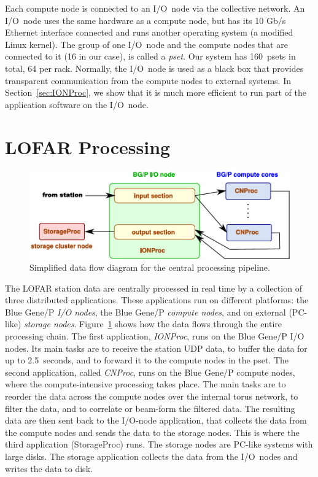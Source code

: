 \documentclass{sig-alternate}
\begin{document}
Each compute node is connected to an I/O~node via the collective network.
An I/O~node uses the same hardware as a compute node, but has its 10 Gb/s Ethernet
interface connected and runs another operating system (a modified Linux kernel).
The group of one I/O~node and the compute nodes that are connected to it (16 in our case),
is called a \emph{pset}.
Our system has 160~psets in total, 64 per rack.
Normally, the I/O~node is used as a black box that provides transparent
communication from the compute nodes to external systems.
In Section~\ref{sec:IONProc}, we show that it is much more
efficient to run part of the application software on the I/O~node.


\section{LOFAR Processing}
\label{sec:processing}

\begin{figure}[ht]
\includegraphics[width=\columnwidth]{processing-overview.pdf}
\caption{Simplified data flow diagram for the central processing pipeline.}
\label{fig:processing}
\end{figure}

The LOFAR station data are centrally processed in real time by a collection
of three distributed applications.
These applications run on different platforms:
the Blue Gene/P \emph{I/O nodes}, the Blue Gene/P \emph{compute nodes}, and on
external (PC-like) \emph{storage nodes}.
Figure~\ref{fig:processing} shows how the data flows through the entire
processing chain.
The first application, \emph{IONProc}, runs on the Blue Gene/P I/O nodes.
Its main tasks are to receive the station UDP data, to buffer the data
for up to 2.5~seconds, and to forward it to the compute nodes in the pset.
The second application, called \emph{CNProc}, runs on the Blue Gene/P compute
nodes, where the compute-intensive processing takes place.
The main tasks are to reorder the data across the compute nodes over the
internal torus network, to filter the data, and to correlate or beam-form
the filtered data.
The resulting data are then sent back to the I/O-node application, that
collects the data from the compute nodes and
sends the data to the storage nodes.
This is where the third application (StorageProc) runs.
The storage nodes are PC-like systems with large disks.
The storage application collects the data from the I/O~nodes and writes the
data to disk.
\end{document}
